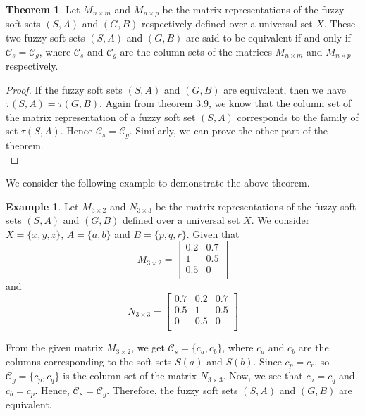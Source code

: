 \documentclass{article}
\theoremstyle{definition}
\newtheorem{theorem}{Theorem}[section]
\newtheorem{example}{Example}[section]
\begin{document}
\begin{theorem}
 Let $M_{n\times m}$ and $M_{n\times p}$ be the matrix representations of the fuzzy soft sets $(S,A)$ and $(G,B)$ respectively defined over a universal set $X$. These two fuzzy soft sets $(S,A)$ and $(G,B)$ are said to be equivalent if and only if ${\mathcal{C}}_s={\mathcal{C}}_g$, where ${\mathcal{C}}_s$ and ${\mathcal{C}}_g$ are the column sets of the matrices $M_{n\times m}$ and $M_{n\times p}$ respectively.
\end{theorem}

\begin{proof}
    
 If the fuzzy soft sets $(S,A)$ and $(G,B)$ are equivalent, then we have $\tau(S,A)= \tau(G,B)$. Again from theorem 3.9, we know that the column set of the matrix representation of a fuzzy soft set $(S,A)$ corresponds to the family of set $\tau(S,A)$. Hence ${\mathcal{C}}_s={\mathcal{C}}_g$. Similarly, we can prove the other part of the theorem.\\
\end{proof}
We consider the following example to demonstrate the above theorem.


  \begin{example}
      Let $M_{3\times 2}$ and $N_{3\times3}$ be the matrix representations of the fuzzy soft sets $(S,A)$ and $(G,B)$ defined over a universal set $X$. We consider $X=\{x, y, z\}$, $A=\{a, b\}$ and $B=\{p, q, r\}$. Given that 
      \[
    M_{3\times 2}=
    \begin{bmatrix}
         0.2 & 0.7 \\
          1 & 0.5 \\
            0.5 & 0 \\
     \end{bmatrix}
     \] and 
     \[
    N_{3\times 3}=
    \begin{bmatrix}
        0.7 & 0.2 & 0.7 \\
          0.5 & 1 & 0.5 \\
           0 & 0.5 & 0 \\
     \end{bmatrix}
     \]

     From the given matrix $M_{3\times 2}$, we get ${\mathcal{C}}_s=\{c_a, c_b\}$, where $c_a$ and $c_b$ are the columns corresponding to the soft sets $S(a)$ and $S(b)$. Since $c_p = c_r$, so ${\mathcal{C}}_g=\{c_p, c_q\}$ is the column set of the matrix $N_{3\times3}$. Now, we see that $c_a = c_q$ and $c_b = c_p$. Hence, ${\mathcal{C}}_s={\mathcal{C}}_g$. Therefore, the fuzzy soft sets $(S,A)$ and $(G,B)$ are equivalent.
  \end{example}
\end{document}
